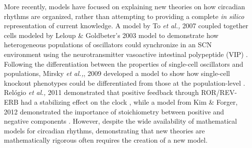 More recently, models have focused on explaining new theories on how circadian rhythms are organized, rather than attempting to providing a complete {\itshape in silico} representation of current knowledge.
A model by To {\itshape et al.,} 2007 coupled together cells modeled by Leloup \& Goldbeter's 2003 model to demonstrate how heterogeneous populations of oscillators could synchronize in an SCN environment using the neurotransmitter vasoactive intestinal polypeptide (VIP) \cite{To2007}.
Following the differentiation between the properties of single-cell oscillators and populations, Mirsky {\itshape et al.,}, 2009 developed a model to show how single-cell knockout phenotypes could be differentiated from those at the population-level \cite{Mirsky2009}.
Rel{\'o}gio {\itshape et al.,} 2011 demonstrated that positive feedback through ROR/REV-ERB had a stabilizing effect on the clock \cite{Relogio2011}, while a model from Kim \& Forger, 2012 demonstrated the importance of stoichiometry between positive and negative components \cite{Kim2012}.
However, despite the wide availability of mathematical models for circadian rhythms, demonstrating that new theories are mathematically rigorous often requires the creation of a new model.

